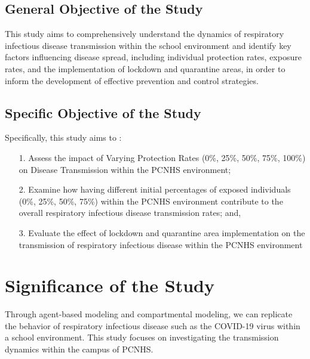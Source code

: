 \subsection{General Objective of the Study}

\indent \indent 
 This study aims to comprehensively understand the dynamics of respiratory infectious disease transmission within the school environment and identify key factors influencing disease spread, including individual protection rates, exposure rates, and the implementation of lockdown and quarantine areas, in order to inform the development of effective prevention and control strategies.
 
\subsection{Specific Objective of the Study}

\indent \indent
Specifically, this study aims to :
\begin{itemize}
	
	\item[1.] Assess the impact of Varying Protection Rates (0\%, 25\%, 50\%, 75\%, 100\%) on Disease Transmission within the PCNHS environment; 
	\item [2.] Examine how having different initial percentages of exposed individuals (0\%, 25\%, 50\%, 75\%) within the PCNHS environment contribute to the overall respiratory infectious disease transmission rates; and,
	\item[3.] Evaluate the effect of lockdown and quarantine area implementation on the transmission of respiratory infectious disease within the PCNHS environment 
\end{itemize}


\section{Significance of the Study}

Through agent-based modeling and compartmental modeling, we can replicate the behavior of respiratory infectious disease such as the COVID-19 virus within a school environment. This study focuses on investigating the transmission dynamics within the campus of PCNHS.

